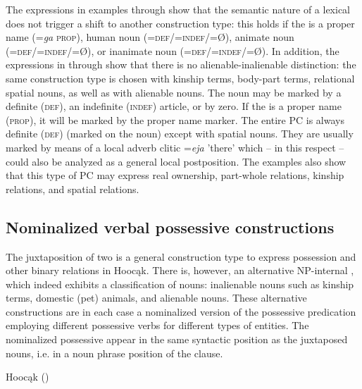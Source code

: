 \documentclass[output=paper]{LSP/langsci}
\begin{document}
The expressions in examples  through  show that the semantic nature of a lexical  does not trigger a shift to another construction type: this holds if the  is a proper name (=\textit{ga} \textsc{prop}), human noun (=\textsc{def/=indef/}=Ø), animate noun (=\textsc{def/=indef}/=Ø), or inanimate noun (=\textsc{def/=indef}/=Ø). In addition, the expressions in  through  show that there is no alienable-inalienable distinction: the same construction type is chosen with kinship terms, body-part terms, relational spatial nouns, as well as with alienable nouns. The  noun may be marked by a definite (\textsc{def}), an indefinite (\textsc{indef}) article, or by zero. If the  is a proper name (\textsc{prop}), it will be marked by the proper name marker. The entire PC is always definite (\textsc{def}) (marked on the  noun) except with spatial nouns. They are usually marked by means of a local adverb clitic =\textit{eja} 'there' which – in this respect – could also be analyzed as a general local postposition. The examples also show that this type of PC may express real ownership, part-whole relations, kinship relations, and spatial relations.
 
\subsection{Nominalized verbal possessive constructions}\label{sec:helmbrecht:3.2} \label{nomvposs}

The juxtaposition of two  is a general construction type to express possession and other binary relations in Hoocąk. There is, however, an alternative NP-internal , which indeed exhibits a classification of nouns: inalienable nouns such as kinship terms, domestic (pet) animals, and alienable nouns. These alternative constructions are in each case a nominalized version of the possessive predication employing different possessive verbs for different types of  entities. The nominalized possessive  appear in the same syntactic position as the juxtaposed nouns, i.e. in a noun phrase position of the clause. 

\ea {}Hoocąk (\citealt[16]{Helmbrecht2003}) \label{seecar}
\end{document}
